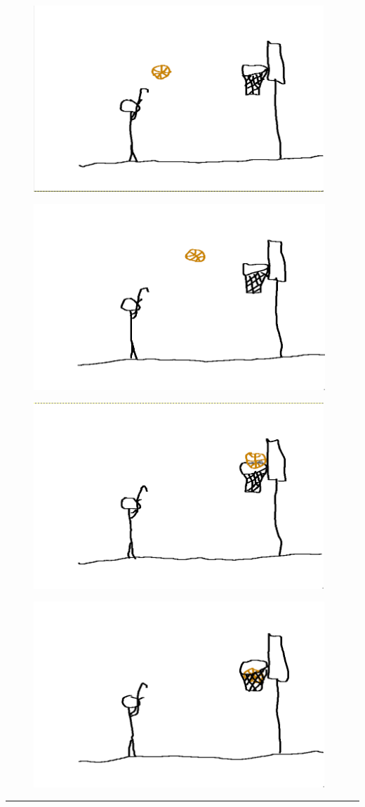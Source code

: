 \documentclass[9pt,letterpaper]{article}
\begin{document}
\begin{figure}[h]
    \centering
    \includegraphics[height=7cm]{Outputs/Frame3.png}
\end{figure}

\newpage
\begin{figure}[h]
    \centering
    \includegraphics[height=7cm]{Outputs/Frame4.png}
\end{figure}

\begin{figure}[h]
    \centering
    \includegraphics[height=7cm]{Outputs/Frame5.png}
\end{figure}

\newpage
\begin{figure}[h]
    \centering
    \includegraphics[height=7cm]{Outputs/Frame6.png}
\end{figure}

\bigskip\bigskip
\hrule
\end{document}

